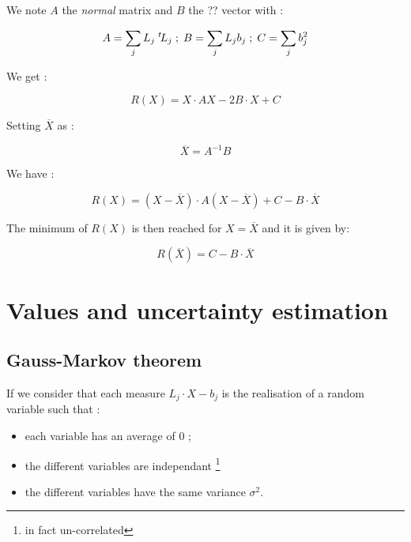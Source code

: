 We note $A$ the \emph{normal} matrix and $B$ the ?? vector  with :

\begin{equation}
	A =   \sum_j L_j  \; ^{t} \! L_j  \; ; \;  B =\sum_j L_j b_j  \; ; \; C =  \sum_j b_j ^2
\end{equation}

We get :

\begin{equation}
	R(X) =  X \cdot A X - 2 B \cdot X +  C
\end{equation}


Setting $\overline X$ as :

\begin{equation}
	\overline X = A^{-1} B \label{LstSq:Sol}
\end{equation}

We have :

\begin{equation}
	R(X) =  (X-\overline X ) \cdot A  (X-\overline X )   +  C - B \cdot \overline X 
\end{equation}

The minimum of $R(X)$ is then reached for $X=\overline X$ and it is given by:

\begin{equation}
	R(\overline X) =    C - B \cdot \overline X \label{Lst:Res:Min}
\end{equation}



\section{Values and uncertainty estimation}

\subsection{Gauss-Markov theorem}
If we consider that each measure $L_j \cdot X - b_j$ is the realisation
of a random variable  such that :

\begin{itemize}
    \item each variable has an average of $0$ ;
    \item  the different variables are independant \footnote{in fact un-correlated}
    \item  the different variables have  the same variance $\sigma ^2$.
\end{itemize}

